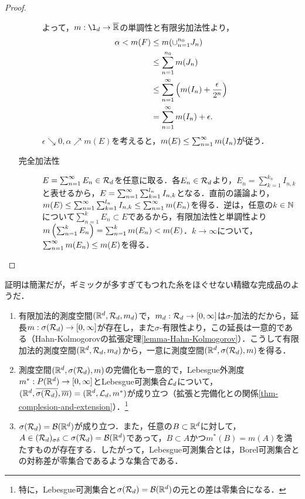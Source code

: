 \documentclass[uplatex, dvipdfmx]{jsreport}
\renewcommand{\B}{\mathcal{B}}
\begin{document}
\begin{proof}
\begin{enumerate}
\begin{description}
            よって，$m:\l_d\to\o{\R}$の単調性と有限劣加法性より，
            \begin{align*}
                \alpha<m(F)&\le m(\cup_{n=1}^{n_0}J_n)\\
                &\le\sum_{n=1}^{n_0}m(J_n)\\
                &\le\sum_{n=1}^\infty\left(m(I_n)+\frac{\epsilon}{2^n}\right)\\
                &=\sum_{n=1}^\infty m(I_n)+\epsilon.
            \end{align*}
            $\epsilon\searrow 0,\alpha\nearrow m(E)$を考えると，$m(E)\le\sum_{n=1}^\infty m(I_n)$が従う．
            \item[完全加法性]
            $E=\sum_{n=1}^\infty E_n\in\mathcal{R}_d$を任意に取る．各$E_n\in\mathcal{R}_d$より，$E_n=\sum_{k=1}^{k_n}I_{n,k}$と表せるから，$E=\sum_{n=1}^\infty\sum_{k=1}^{l_n}I_{n,k}$となる．直前の議論より，$m(E)\le\sum_{n=1}^\infty\sum_{k=1}^{l_n}I_{n,k}\le\sum_{n=1}^\infty m(E_n)$を得る．逆は，任意の$k\in\mathbb{N}$について$\sum^k_{n=1}E_n\subset E$であるから，有限加法性と単調性より$m\left(\sum_{n=1}^kE_n\right)=\sum_{n=1}^km(E_n)<m(E)$．$k\to\infty$について，$\sum_{n=1}^\infty m(E_n)\le m(E)$を得る．
        \end{description}
    \end{enumerate}
\end{proof}
\begin{remarks}
    証明は簡潔だが，ギミックが多すぎてもつれた糸をほぐせない精緻な完成品のようだ．
\end{remarks}

\begin{definition}\mbox{}
    \begin{enumerate}
        \item 有限加法的測度空間$(\mathbb{R}^d,\mathcal{R}_d,m_d)$で，$m_d:\mathcal{R}_d\to[0,\infty]$は$\sigma$-加法的だから，延長$m:\sigma(\mathcal{R}_d)\to[0,\infty]$が存在し，また$\sigma$-有限性より，この延長は一意的である（Hahn-Kolmogorovの拡張定理\ref{lemma-Hahn-Kolmogorov}）．こうして有限加法的測度空間$(\mathbb{R}^d,\mathcal{R}_d,m_d)$から，一意に測度空間$(\mathbb{R}^d,\sigma(\mathcal{R}_d),m)$を得る．
        \item 測度空間$(\mathbb{R}^d,\sigma(\mathcal{R}_d),m)$の完備化も一意的で，Lebesgue外測度$m^*:P(\mathbb{R}^d)\to[0,\infty]$とLebesgue可測集合$\mathcal{L}_d$について，$(\mathbb{R}^d,\overline{\sigma(\mathcal{R}_d)},\overline{m})=(\mathbb{R}^d,\mathcal{L}_d,m^*)$が成り立つ（拡張と完備化との関係\ref{thm-complesion-and-extension}）．\footnote{特に，Lebesgue可測集合と$\sigma(\cR_d)=\B(\R^d)$の元との差は零集合になる．}
        \item $\sigma(\cR_d)=\B(\R^d)$が成り立つ．また，任意の$B\subset\mathbb{R}^d$に対して，$A\in(\cR_d)_{\sigma\delta}\subset\sigma(\cR_d)=\B(\R^d)$であって，$B\subset A$かつ$m^*(B)=m(A)$を満たすものが存在する．したがって，Lebesgue可測集合とは，Borel可測集合との対称差が零集合であるような集合である．
    \end{enumerate}
\end{definition}
\end{document}
